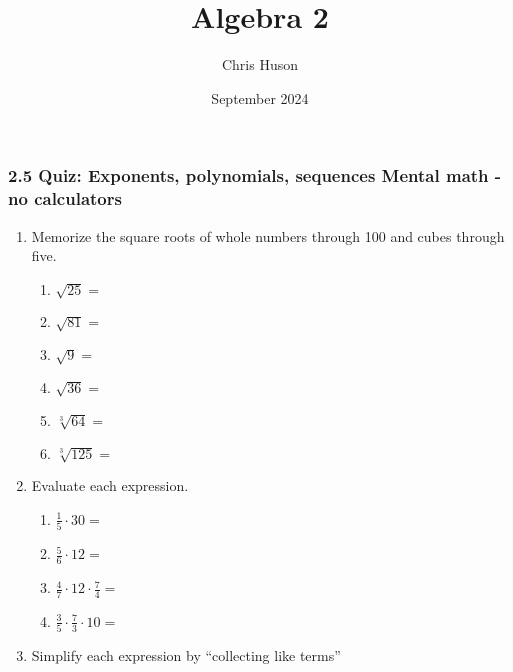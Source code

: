\documentclass[12pt, twoside]{article}
\title{Algebra 2}
\author{Chris Huson}
\date{September 2024}
\begin{document}
\subsubsection*{2.5 Quiz: Exponents, polynomials, sequences \hfill Mental math - no calculators}
\begin{enumerate}[itemsep=0.5cm]

\item Memorize the square roots of whole numbers through 100 and cubes through five.
    \begin{multicols}{2}
        \begin{enumerate}[itemsep=0.5cm]
            \item $\sqrt{25} =$
            \item $\sqrt{81} =$
            \item $\sqrt{9} =$
            \item $\sqrt{36} =$
            \item $\sqrt[3]{64} =$
            \item $\sqrt[3]{125} =$
          \end{enumerate}
    \end{multicols}

\item Evaluate each expression.
    \begin{multicols}{2}
    \begin{enumerate}[itemsep=0.5cm]
        \item $\displaystyle \frac{1}{5} \cdot 30=$
        \item $\displaystyle \frac{5}{6} \cdot 12=$
        \item $\displaystyle \frac{4}{7} \cdot 12 \cdot \frac{7}{4}=$
        \item $\displaystyle \frac{3}{5} \cdot \frac{7}{3} \cdot 10=$
    \end{enumerate}
    \end{multicols}

\item Simplify each expression by ``collecting like terms''
\begin{enumerate}[itemsep=2cm]
  \end{enumerate} \vspace{1cm}


\end{enumerate}
\end{document}
